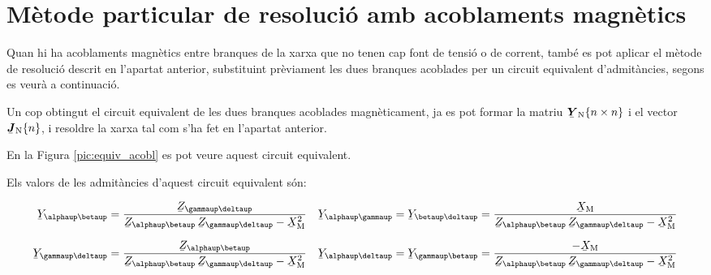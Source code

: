 \section{Mètode particular de resolució amb acoblaments magnètics}

Quan hi ha acoblaments magnètics entre branques de la xarxa que no
tenen cap font de tensió o de corrent, també es pot aplicar el
mètode de resolució descrit en l'apartat anterior, substituint
prèviament les dues branques acoblades per un circuit equivalent
d'admitàncies, segons es veurà a continuació.

Un cop obtingut el circuit equivalent de les dues branques acoblades
magnèticament, ja es pot formar la matriu $\mcmplx{Y}\ped{N}\{n \times n\}$ i
el vector $\mcmplx{J}\ped{N}\{n\}$, i  resoldre la xarxa tal com s'ha fet en
l'apartat anterior.

En la Figura \vref{pic:equiv_acobl} es pot veure aquest circuit
equivalent.
\begin{center}
\centering
   
    \label{pic:equiv_acobl}
\end{center}

Els valors de les admitàncies d'aquest circuit equivalent
són:

\parbox{15cm}
{ \begin{align*}
   \cmplx{Y}_{\alphaup\betaup} &= \frac{\cmplx{Z}_{\gammaup\deltaup}}{\cmplx{Z}_{\alphaup\betaup}\, \cmplx{Z}_{\gammaup\deltaup}-\cmplx{X}\ped{M}^2} &
   \cmplx{Y}_{\alphaup\gammaup} &= \cmplx{Y}_{\betaup\deltaup} = \frac{\cmplx{X}\ped{M}}{\cmplx{Z}_{\alphaup\betaup}\, \cmplx{Z}_{\gammaup\deltaup}-\cmplx{X}\ped{M}^2} \\[1.5ex]
   \cmplx{Y}_{\gammaup\deltaup} &= \frac{\cmplx{Z}_{\alphaup\betaup}}{\cmplx{Z}_{\alphaup\betaup}\, \cmplx{Z}_{\gammaup\deltaup}-\cmplx{X}\ped{M}^2} &
   \cmplx{Y}_{\alphaup\deltaup} &= \cmplx{Y}_{\gammaup\betaup} = \frac{-\cmplx{X}\ped{M}}{\cmplx{Z}_{\alphaup\betaup}\, \cmplx{Z}_{\gammaup\deltaup}-\cmplx{X}\ped{M}^2}
\end{align*} }
\hfill
\parbox{1cm}{\begin{align}\end{align}}

